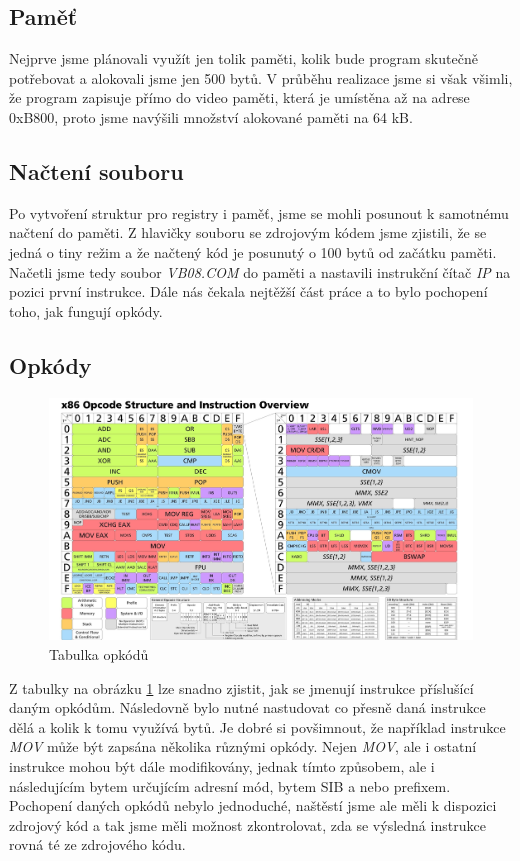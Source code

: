 \documentclass[a4paper, 12pt]{article}
\begin{document}
\subsection{Paměť}
Nejprve jsme plánovali využít jen tolik paměti, kolik bude program skutečně potřebovat a alokovali jsme jen 500 bytů. V průběhu realizace jsme si však všimli, že program zapisuje přímo do video paměti, která je umístěna až na adrese 0xB800, proto jsme navýšili množství alokované paměti na 64 kB.
\subsection{Načtení souboru}
Po vytvoření struktur pro registry i paměť, jsme se mohli posunout k samotnému načtení do paměti. Z hlavičky souboru se zdrojovým kódem jsme zjistili, že se jedná o tiny režim a že načtený kód je posunutý o 100 bytů od začátku paměti. Načetli jsme tedy soubor \textit{VB08.COM} do paměti a nastavili instrukční čítač \textit{IP} na pozici první instrukce. Dále nás čekala nejtěžší část práce a to bylo pochopení toho, jak fungují opkódy.
\subsection{Opkódy}
\begin{figure}[H]
    \centering
	\includegraphics[width=\textwidth]{img/op.jpg}\par
    \caption{Tabulka opkódů}
  	\label{op}
\end{figure}
Z tabulky na obrázku \ref{op} lze snadno zjistit, jak se jmenují instrukce příslušící daným opkódům. Následovně bylo nutné nastudovat co přesně daná instrukce dělá a kolik k tomu využívá bytů. Je dobré si povšimnout, že například instrukce \textit{MOV} může být zapsána několika různými opkódy. Nejen \textit{MOV}, ale i ostatní instrukce mohou být dále modifikovány, jednak tímto způsobem, ale i následujícím bytem určujícím adresní mód, bytem SIB a nebo prefixem. Pochopení daných opkódů nebylo jednoduché, naštěstí jsme ale měli k dispozici zdrojový kód a tak jsme měli možnost zkontrolovat, zda se výsledná instrukce rovná té ze zdrojového kódu.
\end{document}
